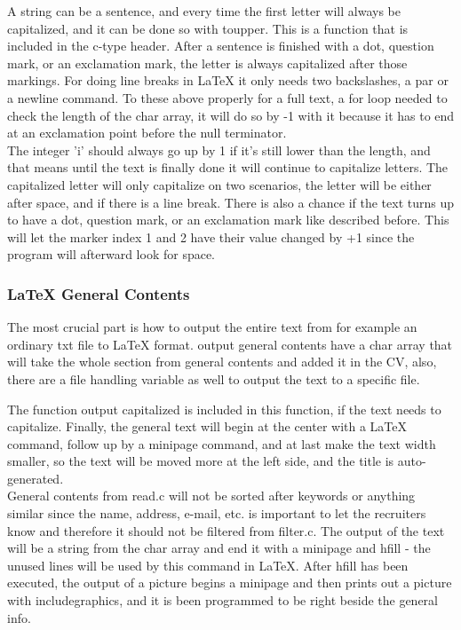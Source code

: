 A string can be a sentence, and every time the first letter will always be capitalized,
and it can be done so with toupper.
This is a function that is included in the c-type header.
After a sentence is finished with a dot, question mark, or an exclamation mark, 
the letter is always capitalized after those markings.
For doing line breaks in LaTeX it only needs two backslashes, a par or a newline command. 
To these above properly for a full text, a for loop needed to check the length of the char array,
it will do so by -1 with it because it has to end at an exclamation point before the null terminator.\\

The integer 'i' should always go up by 1 if it's still lower than the length, 
and that means until the text is finally done it will continue to capitalize letters. The capitalized letter will only capitalize on two scenarios, 
the letter will be either after space, and if there is a line break.
There is also a chance if the text turns up to have a dot, question mark, or an exclamation mark like described before.
This will let the marker index 1 and 2 have their value changed by +1 since the program will afterward look for space.\\

\subsubsection{LaTeX General Contents}
The most crucial part is how to output the entire text from for example an ordinary txt file to LaTeX format.
output general contents have a char array that will take the whole section from general contents and added it in the CV,
also, there are a file handling variable as well to output the text to a specific file. 

The function output capitalized is included in this function, if the text needs to capitalize.
Finally, the general text will begin at the center with a LaTeX command, follow up by a minipage command, 
and at last make the text width smaller, so the text will be moved more at the left side, and the title is auto-generated. \\

General contents from read.c will not be sorted after keywords or anything similar since the name, address, e-mail, etc. is important to let the recruiters know and therefore it should not be filtered from filter.c.
The output of the text will be a string from the char array 
and end it with a minipage and hfill - the unused lines will be used by this command in LaTeX.
After hfill has been executed, the output of a picture begins a minipage 
and then prints out a picture with includegraphics, and it is been programmed to be right beside the general info. 

